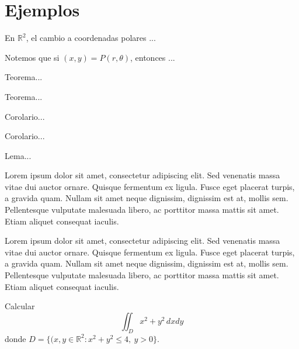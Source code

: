 \chapter{Ejemplos}

\begin{defi}
    En $\mathbb{R}^2$, el cambio a coordenadas polares ...
\end{defi}

\begin{advertencia}
    Notemos que si $(x,y)=P(r,\theta)$, entonces ...
\end{advertencia}

\begin{teo}
    Teorema...
\end{teo}

\begin{teo}
    Teorema...
\end{teo}

\begin{cor}
    Corolario...
\end{cor}

\begin{cor}[Título]
    Corolario...
\end{cor}

\begin{lem}
    Lema...
\end{lem}

\begin{obs}
    Lorem ipsum dolor sit amet, consectetur adipiscing elit. Sed venenatis massa vitae dui auctor ornare. Quisque fermentum ex ligula. Fusce eget placerat turpis, a gravida quam. Nullam sit amet neque dignissim, dignissim est at, mollis sem. Pellentesque vulputate malesuada libero, ac porttitor massa mattis sit amet. Etiam aliquet consequat iaculis.
\end{obs}

\begin{ejem}
    Lorem ipsum dolor sit amet, consectetur adipiscing elit. Sed venenatis massa vitae dui auctor ornare. Quisque fermentum ex ligula. Fusce eget placerat turpis, a gravida quam. Nullam sit amet neque dignissim, dignissim est at, mollis sem. Pellentesque vulputate malesuada libero, ac porttitor massa mattis sit amet. Etiam aliquet consequat iaculis.
\end{ejem}

\begin{ejer}
    Calcular \[\iint_D x^2+y^2\,dxdy\] donde $D=\{(x,y\in\mathbb{R}^2:x^2+y^2\leq 4,\ y>0\}$.
\end{ejer}

